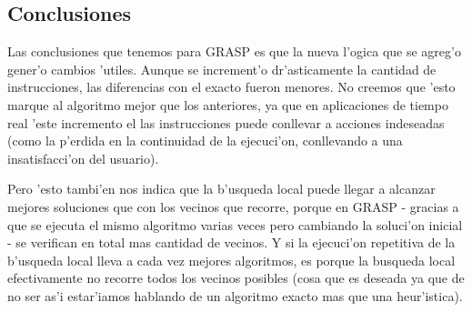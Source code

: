 \subsection{Conclusiones}
Las conclusiones que tenemos para GRASP es que la nueva l'ogica que se agreg'o gener'o cambios 'utiles. Aunque se increment'o dr'asticamente la cantidad de instrucciones, las diferencias con el exacto fueron menores. No creemos que 'esto marque al algoritmo mejor que los anteriores, ya que en aplicaciones de tiempo real 'este incremento el las instrucciones puede conllevar a acciones indeseadas (como la p'erdida en la continuidad de la ejecuci'on, conllevando a una insatisfacci'on del usuario).

Pero 'esto tambi'en nos indica que la b'usqueda local puede llegar a alcanzar mejores soluciones que con los vecinos que recorre, porque en GRASP - gracias a que se ejecuta el mismo algoritmo varias veces pero cambiando la soluci'on inicial - se verifican en total mas cantidad de vecinos. Y si la ejecuci'on repetitiva de la b'usqueda local lleva a cada vez mejores algoritmos, es porque la busqueda local efectivamente no recorre todos los vecinos posibles (cosa que es deseada ya que de no ser as'i estar'iamos hablando de un algoritmo exacto mas que una heur'istica).
